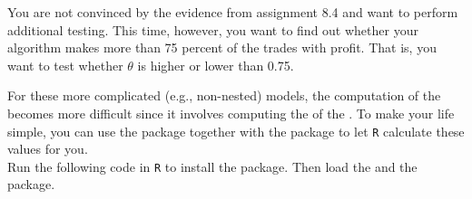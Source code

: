 \setcounter{chapter}{8}
\setcounter{section}{5}
\setcounter{question}{0}



You are not convinced by the evidence from assignment 8.4 and want to perform additional testing. This time, however, you want to find out whether your algorithm makes more than 75 percent of the trades with profit. That is, you want to test whether $\theta$ is higher or lower than 0.75.\\



For these more complicated (e.g., non-nested) models, the computation of the  becomes more difficult since it involves computing the  of the . To make your life simple, you can use the  package together with the  package to let \texttt{R} calculate these values for you. \\

Run the following code in \texttt{R} to install the  package. Then load the  and the  package. \\
\\

